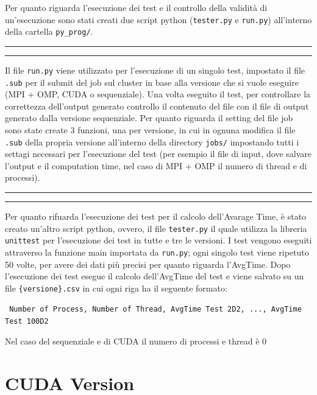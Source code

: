 \documentclass{article}
\begin{document}
  Per quanto riguarda l'esecuzione dei test e il controllo della validità di un'esecuzione sono stati creati due script python (\verb|tester.py| e \verb|run.py|) all'interno della cartella \verb|py_prog/|.
  \begin{center}
    \rule{2.5cm}{1pt}  \rule{2.5cm}{1pt}
  \end{center}
  Il file \verb|run.py| viene utilizzato per l'esecuzione di un singolo test, impostato il file \verb|.sub| per il submit del job sul cluster in base alla versione che si vuole eseguire (MPI + OMP, CUDA o sequenziale). 
  Una volta eseguito il test, per controllare la correttezza dell'output generato controllo il contenuto del file con il file di output generato dalla versione sequenziale.
  Per quanto riguarda il setting del file job sono state create 3 funzioni, una per versione, in cui in ognuna modifica il file \verb|.sub| della propria versione all'interno della directory \verb|jobs/| impostando 
  tutti i settagi necessari per l'esecuzione del test (per esempio il file di input, dove salvare l'output e il computation time, nel caso di MPI + OMP il numero di thread e di processi).
  \begin{center}
    \rule{2.5cm}{1pt}  \rule{2.5cm}{1pt}
  \end{center}
  Per quanto rifuarda l'esecuzione dei test per il calcolo dell'Avarage Time, è stato creato un'altro script python, ovvero, il file \verb|tester.py| il quale utilizza
  la libreria \verb|unittest| per l'esecuzione dei test in tutte e tre le versioni. I test vengono eseguiti attraverso la funzione main importata da \verb|run.py|; ogni singolo 
  test viene ripetuto 50 volte, per avere dei dati più precisi per quanto riguarda l'AvgTime.
  Dopo l'esecuzione dei test esegue il calcolo dell'AvgTime del test e viene salvato su un file \verb|{versione}.csv| in cui ogni riga ha il seguente formato: 
  \begin{center}
    \verb| Number of Process, Number of Thread, AvgTime Test 2D2, ..., AvgTime Test 100D2 |  
  
    \small *Nel caso del sequenziale e di CUDA il numero di processi e thread è 0
  \end{center}

  \section{CUDA Version}
\end{document}
